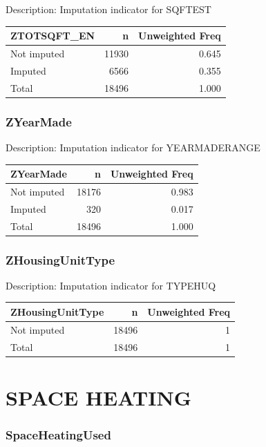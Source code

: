 \documentclass[
]{krantz}
\begin{document}
Description: Imputation indicator for SQFTEST

\begin{tabular}[t]{l|r|r}
\hline
ZTOTSQFT\_EN & n & Unweighted Freq\\
\hline
Not imputed & 11930 & 0.645\\
\hline
Imputed & 6566 & 0.355\\
\hline
Total & 18496 & 1.000\\
\hline
\end{tabular}

\hypertarget{zyearmade}{%
\subsubsection*{ZYearMade}\label{zyearmade}}


Description: Imputation indicator for YEARMADERANGE

\begin{tabular}[t]{l|r|r}
\hline
ZYearMade & n & Unweighted Freq\\
\hline
Not imputed & 18176 & 0.983\\
\hline
Imputed & 320 & 0.017\\
\hline
Total & 18496 & 1.000\\
\hline
\end{tabular}

\hypertarget{zhousingunittype}{%
\subsubsection*{ZHousingUnitType}\label{zhousingunittype}}


Description: Imputation indicator for TYPEHUQ

\begin{tabular}[t]{l|r|r}
\hline
ZHousingUnitType & n & Unweighted Freq\\
\hline
Not imputed & 18496 & 1\\
\hline
Total & 18496 & 1\\
\hline
\end{tabular}

\hypertarget{space-heating}{%
\section{SPACE HEATING}\label{space-heating}}

\hypertarget{spaceheatingused}{%
\subsubsection*{SpaceHeatingUsed}\label{spaceheatingused}}
\end{document}

